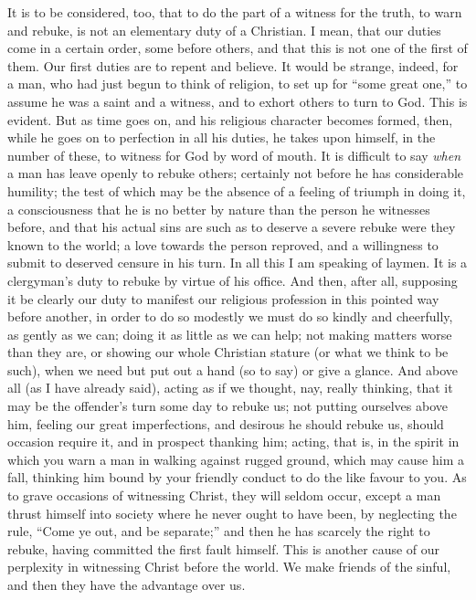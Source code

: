 It is to be considered, too, that to do the part of a
witness for the truth, to warn and rebuke, is not an
elementary duty of a Christian. I mean, that our duties
come in a certain order, some before others, and that
this is not one of the first of them. Our first duties
are to repent and believe. It would be strange, indeed,
for a man, who had just begun to think of religion, to
set up for ``some great one,'' to assume he was a
saint and a witness, and to exhort others to turn to God.
This is evident. But as time goes on, and his religious
character becomes formed, then, while he goes on to
perfection in all his duties, he takes upon himself, in
the number of these, to witness for God by word of mouth.
It is difficult to say \emph{when} a man has leave openly
to rebuke others; certainly not before he has
considerable humility; the test of which may be the
absence of a feeling of triumph in doing it, a
consciousness that he is no better by nature than the
person he witnesses before, and that his actual sins are
such as to deserve a severe rebuke were they known to the
world; a love towards the person reproved, and a
willingness to submit to deserved censure in his turn. In
all this I am speaking of laymen. It is a clergyman's
duty to rebuke by virtue of his office. And then, after
all, supposing it be clearly our duty to manifest our
religious profession in this pointed way before another,
in order to do so modestly we must do so kindly and
cheerfully, as gently as we can; doing it as little as we
can help; not making matters worse than they are, or
showing our whole Christian stature (or what we think to
be such), when we need but put out a hand (so to say) or
give a glance. And above all (as I have already said),
acting as if we thought, nay, really thinking, that it
may be the offender's turn some day to rebuke us; not
putting ourselves above him, feeling our great
imperfections, and desirous he should rebuke us, should
occasion require it, and in prospect thanking him;
acting, that is, in the spirit in which you warn a man in
walking against rugged ground, which may cause him a
fall, thinking him bound by your friendly conduct to do
the like favour to you. As to grave occasions of
witnessing Christ, they will seldom occur, except a man
thrust himself into society where he never ought to have
been, by neglecting the rule, ``Come ye out, and be
separate;'' and then he has scarcely the right to
rebuke, having committed the first fault himself. This is
another cause of our perplexity in witnessing Christ
before the world. We make friends of the sinful, and then
they have the advantage over us.


